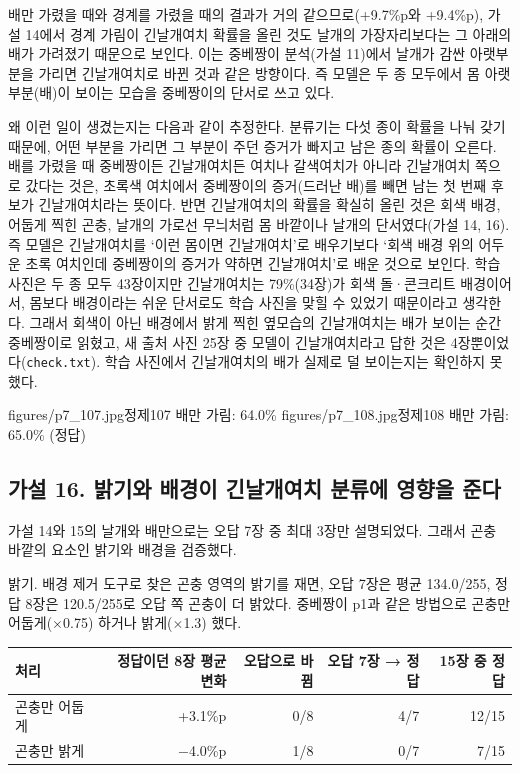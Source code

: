 \documentclass[11pt]{article}
\begin{document}
배만 가렸을 때와 경계를 가렸을 때의 결과가 거의 같으므로(+9.7\%p와 +9.4\%p), 가설 14에서 경계 가림이 긴날개여치 확률을 올린 것도 날개의 가장자리보다는 그 아래의 배가 가려졌기 때문으로 보인다. 이는 중베짱이 분석(가설 11)에서 날개가 감싼 아랫부분을 가리면 긴날개여치로 바뀐 것과 같은 방향이다. 즉 모델은 두 종 모두에서 몸 아랫부분(배)이 보이는 모습을 중베짱이의 단서로 쓰고 있다. 

왜 이런 일이 생겼는지는 다음과 같이 추정한다. 분류기는 다섯 종이 확률을 나눠 갖기 때문에, 어떤 부분을 가리면 그 부분이 주던 증거가 빠지고 남은 종의 확률이 오른다. 배를 가렸을 때 중베짱이든 긴날개여치든 여치나 갈색여치가 아니라 긴날개여치 쪽으로 갔다는 것은, 초록색 여치에서 중베짱이의 증거(드러난 배)를 빼면 남는 첫 번째 후보가 긴날개여치라는 뜻이다. 반면 긴날개여치의 확률을 확실히 올린 것은 회색 배경, 어둡게 찍힌 곤충, 날개의 가로선 무늬처럼 몸 바깥이나 날개의 단서였다(가설 14, 16). 즉 모델은 긴날개여치를 `이런 몸이면 긴날개여치'로 배우기보다 `회색 배경 위의 어두운 초록 여치인데 중베짱이의 증거가 약하면 긴날개여치'로 배운 것으로 보인다. 학습 사진은 두 종 모두 43장이지만 긴날개여치는 79\%(34장)가 회색 돌·콘크리트 배경이어서, 몸보다 배경이라는 쉬운 단서로도 학습 사진을 맞힐 수 있었기 때문이라고 생각한다. 그래서 회색이 아닌 배경에서 밝게 찍힌 옆모습의 긴날개여치는 배가 보이는 순간 중베짱이로 읽혔고, 새 출처 사진 25장 중 모델이 긴날개여치라고 답한 것은 4장뿐이었다(\texttt{check.txt}). 학습 사진에서 긴날개여치의 배가 실제로 덜 보이는지는 확인하지 못했다.

           {figures/p7_107.jpg}{정제107 배만 가림: 64.0\%}
           {figures/p7_108.jpg}{정제108 배만 가림: 65.0\% (정답)}

\subsection*{가설 16. 밝기와 배경이 긴날개여치 분류에 영향을 준다}

가설 14와 15의 날개와 배만으로는 오답 7장 중 최대 3장만 설명되었다. 그래서 곤충 바깥의 요소인 밝기와 배경을 검증했다.

밝기. 배경 제거 도구로 찾은 곤충 영역의 밝기를 재면, 오답 7장은 평균 134.0/255, 정답 8장은 120.5/255로 오답 쪽 곤충이 더 밝았다. 중베짱이 p1과 같은 방법으로 곤충만 어둡게($\times$0.75) 하거나 밝게($\times$1.3) 했다.

\begin{center}\footnotesize
\begin{tabular}{lrrrr}
\toprule
처리 & 정답이던 8장 평균 변화 & 오답으로 바뀜 & 오답 7장 → 정답 & 15장 중 정답 \\
\midrule
곤충만 어둡게 & +3.1\%p & 0/8 & 4/7 & 12/15 \\
곤충만 밝게 & $-$4.0\%p & 1/8 & 0/7 & 7/15 \\
\bottomrule
\end{tabular}
\end{center}
\end{document}
